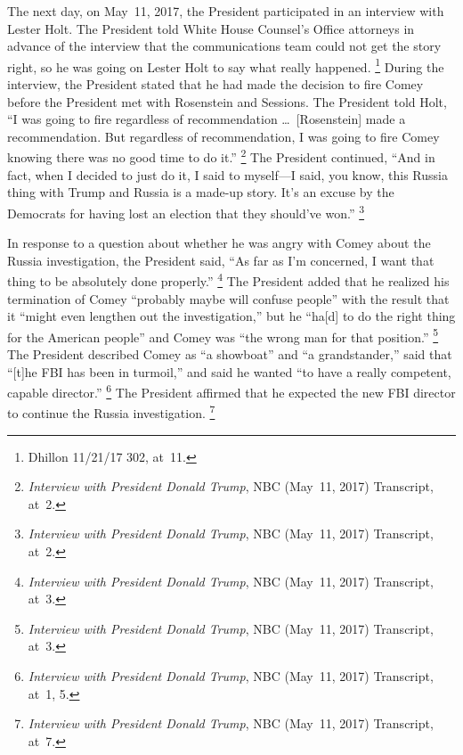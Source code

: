 The next day, on May~11, 2017, the President participated in an interview with Lester Holt.
The President told White House Counsel's Office attorneys in advance of the interview that the communications team could not get the story right, so he was going on Lester Holt to say what really happened.%
\footnote{Dhillon 11/21/17 302, at~11.}
During the interview, the President stated that he had made the decision to fire Comey before the President met with Rosenstein and Sessions.
The President told Holt, ``I was going to fire regardless of recommendation \dots\ [Rosenstein] made a recommendation.
But regardless of recommendation, I was going to fire Comey knowing there was no good time to do it.''%
\footnote{\textit{Interview with President Donald Trump}, NBC (May~11, 2017) Transcript, at~2.}
The President continued, ``And in fact, when I decided to just do it, I said to myself---I said, you know, this Russia thing with Trump and Russia is a made-up story.
It's an excuse by the Democrats for having lost an election that they should've won.''%
\footnote{\textit{Interview with President Donald Trump}, NBC (May~11, 2017) Transcript, at~2.}

In response to a question about whether he was angry with Comey about the Russia investigation, the President said, ``As far as I'm concerned, I want that thing to be absolutely done properly.''%
\footnote{\textit{Interview with President Donald Trump}, NBC (May~11, 2017) Transcript, at~3.}
The President added that he realized his termination of Comey ``probably maybe will confuse people'' with the result that it ``might even lengthen out the investigation,'' but he ``ha[d] to do the right thing for the American people'' and Comey was ``the wrong man for that position.''%
\footnote{\textit{Interview with President Donald Trump}, NBC (May~11, 2017) Transcript, at~3.}
The President described Comey as ``a showboat'' and ``a grandstander,'' said that ``[t]he FBI has been in turmoil,'' and said he wanted ``to have a really competent, capable director.''%
\footnote{\textit{Interview with President Donald Trump}, NBC (May~11, 2017) Transcript, at~1, 5.}
The President affirmed that he expected the new FBI director to continue the Russia investigation.%
\footnote{\textit{Interview with President Donald Trump}, NBC (May~11, 2017) Transcript, at~7.}

